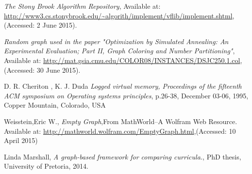\begin{thebibliography}{19}
	\emph{The Stony Brook Algorithm Repository},
	Available at: \url{http://www3.cs.stonybrook.edu/~algorith/implement/vflib/implement.shtml},
	(Accessed: 2 June 2015).	
		
	\emph{Random graph used in the paper
              "Optimization by Simulated Annealing: An
               Experimental Evaluation; Part II, Graph
               Coloring and Number Partitioning"},
	Available at: \url{http://mat.gsia.cmu.edu/COLOR08/INSTANCES/DSJC250.1.col},
	(Accessed: 30 June 2015).
	
	D. R. Cheriton , K. J. Duda
	\emph{Logged virtual memory, Proceedings of the fifteenth ACM symposium on Operating systems principles},
	 p.26-38, December 03-06, 1995, Copper Mountain, Colorado, USA 
	 
	Weisstein,Eric W.,
	\emph{Empty Graph},From MathWorld–A Wolfram Web Resource.
	Available at: \url{http://mathworld.wolfram.com/EmptyGraph.html},(Accessed: 10 April 2015)

	Linda Marshall,
	\emph{A graph-based framework for comparing curricula.},
	PhD thesis, University of Pretoria, 2014.
\end{thebibliography}